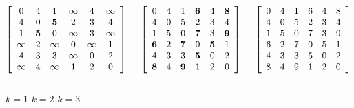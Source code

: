 \begin{Boxample}[0]
\begin{samepage}
{\footnotesize
%
\[
\left[
\begin{array}{cccccc} %
0        & 4        & 1        &  \infty  & 4        &  \infty  \\
4        & 0        & \textbf{5}    & 2        & 3        & 4 \\
1        & \textbf{5}    & 0        &  \infty  & 3        &  \infty  \\
 \infty  & 2        &  \infty  & 0        &  \infty  & 1 \\
4        & 3        & 3        &  \infty  & 0        & 2 \\
 \infty  & 4        &  \infty  & 1        & 2        & 0 \\
\end{array}
\right]
\hspace{.5cm}
\left[
\begin{array}{cccccc} %
0        & 4        & 1        & \textbf{6}    & 4     & \textbf{8} \\
4        & 0        & 5        & 2        & 3        & 4 \\
1        & 5        & 0        & \textbf{7}    & 3      & \textbf{9} \\
\textbf{6}    & 2        & \textbf{7}    & 0        & \textbf{5}  & 1 \\
4        & 3        & 3        & \textbf{5}    & 0        & 2 \\
\textbf{8}   & 4        & \textbf{9}    & 1        & 2        & 0 \\
\end{array}
\right]
\hspace{.5cm}
\left[
\begin{array}{cccccc} %
0    & 4   & 1   & 6    & 4    & 8 \\
4    & 0   & 5   & 2    & 3    & 4 \\
1    & 5   & 0   & 7    & 3    & 9 \\
6    & 2   & 7   & 0    & 5    & 1 \\
4    & 3   & 3   & 5    & 0    & 2 \\
8    & 4   & 9   & 1    & 2    & 0 \\
\end{array}
\right]
\]\\[-5pt]
\hspace*{1in}$k=1$ \hspace{1.2in} $k=2$ \hspace{1.2in} $k=3$ \\
}
\end{samepage}
\end{Boxample}
